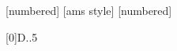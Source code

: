 \newcommand*{\refeq}[1]{%
 \begingroup
\hypersetup{ 
linkcolor=linkequation, 
linkbordercolor=linkequation,
}%
\ref{#1}%
 \endgroup
}

[numbered]
[ams style]
[numbered]


\usepackage{enumerate}    
\usepackage{dcolumn}
\usepackage{verbatim}
\newcolumntype{d}[0]{D{.}{.}{5}}
\beamertemplatenavigationsymbolsempty


